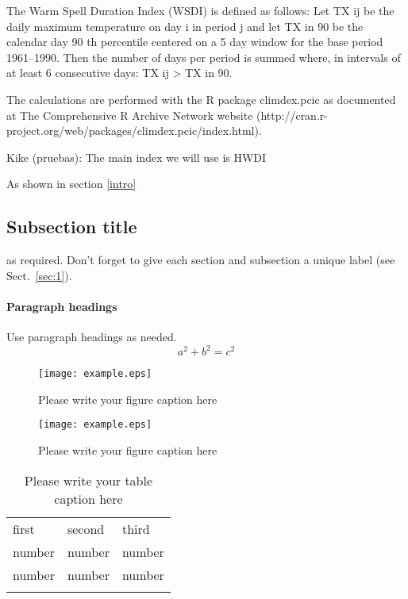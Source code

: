 The Warm Spell Duration Index (WSDI) is defined as follows: Let TX ij be the daily maximum temperature on day i in period j and let TX in 90 be the calendar day 90 th percentile centered on a 5 day window for the base period 1961–1990. Then the number of days per period is summed where, in intervals of at least 6 consecutive days: TX ij > TX in 90.

The calculations are performed with the R package climdex.pcic as documented at The Comprehensive R Archive Network website (http://cran.r-project.org/web/packages/climdex.pcic/index.html).  

Kike (pruebas): The main index we will use is HWDI \citep{rus_al2004}


As shown in section \ref{intro}
\label{sec:1}
\subsection{Subsection title}
\label{sec:2}
as required. Don't forget to give each section
and subsection a unique label (see Sect.~\ref{sec:1}).
\paragraph{Paragraph headings} Use paragraph headings as needed.
\begin{equation}
a^2+b^2=c^2
\end{equation}

\begin{figure}
  \texttt{[image: example.eps]}
\caption{Please write your figure caption here}
\label{fig:1}       %
\end{figure}
%
\begin{figure*}
  \texttt{[image: example.eps]}
\caption{Please write your figure caption here}
\label{fig:2}       %
\end{figure*}
%
\begin{table}
\caption{Please write your table caption here}
\label{tab:1}       %
\begin{tabular}{lll}
\hline\noalign{\smallskip}
first & second & third  \\
\noalign{\smallskip}\hline\noalign{\smallskip}
number & number & number \\
number & number & number \\
\noalign{\smallskip}\hline
\end{tabular}
\end{table}


